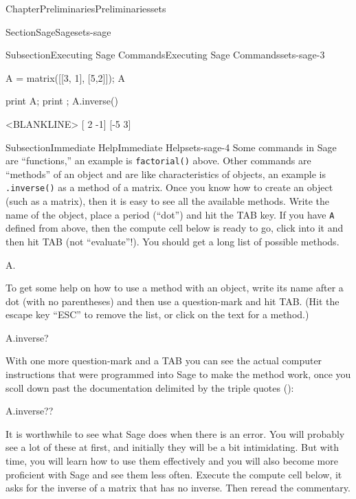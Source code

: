 \documentclass[oneside,10pt,]{book}
\newcommand{\mono}[1]{\texttt{#1}}
\numberwithin{equation}{section}
\begin{document}
\begin{chapterptx}{Chapter}{Preliminaries}{}{Preliminaries}{}{}{sets}
\begin{sectionptx}{Section}{Sage}{}{Sage}{}{}{sets-sage}
\begin{subsectionptx}{Subsection}{Executing Sage Commands}{}{Executing Sage Commands}{}{}{sets-sage-3}
\begin{sageinput}
A = matrix([[3, 1], [5,2]]); A
\end{sageinput}
\begin{sageoutput}
[3 1]
[5 2]
\end{sageoutput}
\begin{sageinput}
print A; print ; A.inverse()
\end{sageinput}
\begin{sageoutput}
[3 1]
[5 2]
<BLANKLINE>
[ 2 -1]
[-5  3]
\end{sageoutput}
\end{subsectionptx}
%
%
\typeout{************************************************}
\typeout{************************************************}
%
\begin{subsectionptx}{Subsection}{Immediate Help}{}{Immediate Help}{}{}{sets-sage-4}
Some commands in Sage are ``functions,'' an example is \mono{factorial()} above.  Other commands are ``methods'' of an object and are like characteristics of objects, an example is \mono{.inverse()} as a method of a matrix.  Once you know how to create an object (such as a matrix), then it is easy to see all the available methods.  Write the name of the object, place a period (``dot'') and hit the TAB key.  If you have \mono{A} defined from above, then the compute cell below is ready to go, click into it and then hit TAB (not ``evaluate''!).  You should get a long list of possible methods.%
\begin{sageinput}
A.
\end{sageinput}
To get some help on how to use a method with an object, write its name after a dot (with no parentheses) and then use a question-mark and hit TAB.  (Hit the escape key ``ESC'' to remove the list, or click on the text for a method.)%
\begin{sageinput}
A.inverse?
\end{sageinput}
With one more question-mark and a TAB you can see the actual computer instructions that were programmed into Sage to make the method work, once you scoll down past the documentation delimited by the triple quotes (\mono{\textquotedbl{}\textquotedbl{}\textquotedbl{}}):%
\begin{sageinput}
A.inverse??
\end{sageinput}
It is worthwhile to see what Sage does when there is an error.  You will probably see a lot of these at first, and initially they will be a bit intimidating.  But with time, you will learn how to use them effectively and you will also become more proficient with Sage and see them less often.  Execute the compute cell below, it asks for the inverse of a matrix that has no inverse.  Then reread the commentary.%

\end{subsectionptx}
\end{sectionptx}
\end{chapterptx}
\end{document}
